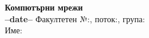 \documentclass[11pt,addpoints,twoside]{exam}
\begin{document}
\pagestyle{headandfoot}
\firstpageheader
  {\large\bfseries Компютърни мрежи\\--date--}
  {}
  {Факултетен №:\enspace\makebox[2cm]{\dotfill},
    поток:\enspace\makebox[1cm]{\dotfill},
    група:\enspace\makebox[1cm]{\dotfill}\\
    Име:\enspace\makebox[8.8cm]{\dotfill}}




\cleardoublepage


\end{document}
